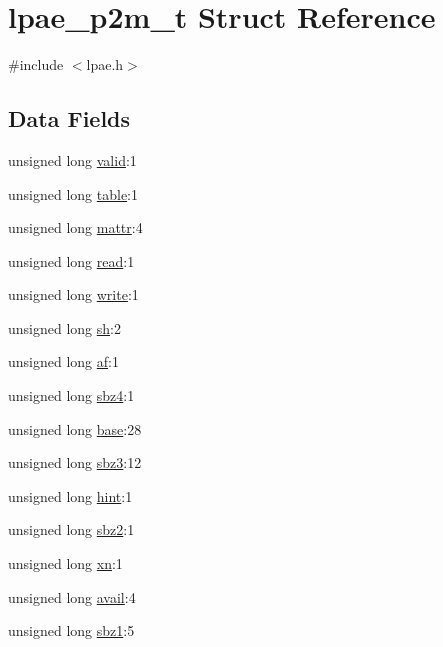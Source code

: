 \hypertarget{structlpae__p2m__t}{\section{lpae\-\_\-p2m\-\_\-t \-Struct \-Reference}
\label{structlpae__p2m__t}
}


{\ttfamily \#include $<$lpae.\-h$>$}

\subsection*{\-Data \-Fields}
\begin{DoxyCompactItemize}
\item 
unsigned long \hyperlink{structlpae__p2m__t_a7bcbc21e402fb9e3dc07789d414ef17c}{valid}\-:1
\item 
unsigned long \hyperlink{structlpae__p2m__t_afe6d8cf4d4c78126d82831e6d5ef5483}{table}\-:1
\item 
unsigned long \hyperlink{structlpae__p2m__t_abb75a9f607e52a07db6a528672e0ccd6}{mattr}\-:4
\item 
unsigned long \hyperlink{structlpae__p2m__t_a414a71904272e5b5fce01917028fb426}{read}\-:1
\item 
unsigned long \hyperlink{structlpae__p2m__t_aff1f8e39a81cacd30783afe206b0835e}{write}\-:1
\item 
unsigned long \hyperlink{structlpae__p2m__t_a8388cd14eb45903279fca66cedfa5ec7}{sh}\-:2
\item 
unsigned long \hyperlink{structlpae__p2m__t_a0f5634df96396057ace3b5f21b1cb381}{af}\-:1
\item 
unsigned long \hyperlink{structlpae__p2m__t_a38ba2ebd33232186b46dd6c586cdef25}{sbz4}\-:1
\item 
unsigned long \hyperlink{structlpae__p2m__t_a74f95eab64fb23344e30879684489f6f}{base}\-:28
\item 
unsigned long \hyperlink{structlpae__p2m__t_abec53fb8579fdb4fbbed7e95ca3433d1}{sbz3}\-:12
\item 
unsigned long \hyperlink{structlpae__p2m__t_a6b9526601b3748535699c90ec4d83a70}{hint}\-:1
\item 
unsigned long \hyperlink{structlpae__p2m__t_af8da50342df58644c092236709963e4c}{sbz2}\-:1
\item 
unsigned long \hyperlink{structlpae__p2m__t_a14c376b2856f5d0a79874df679a35d94}{xn}\-:1
\item 
unsigned long \hyperlink{structlpae__p2m__t_a09631255ee08cc058acd8bc1caff188c}{avail}\-:4
\item 
unsigned long \hyperlink{structlpae__p2m__t_aaaf6b94202af054e3777a0fc8938ea85}{sbz1}\-:5
\end{DoxyCompactItemize}


